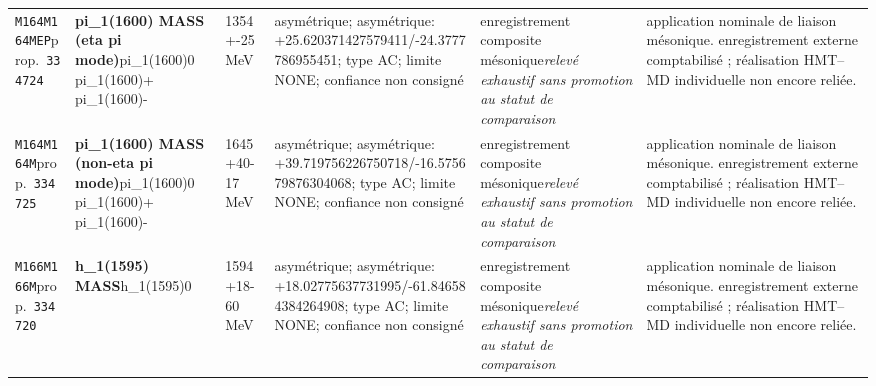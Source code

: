 \begin{landscape}
\begin{longtable}{L{1.85cm}L{4.45cm}L{2.35cm}L{4.05cm}L{3.35cm}L{7.15cm}}
\texttt{M164}\newline \texttt{M164MEP}\newline prop.\ \texttt{334724} & \textbf{pi\_\allowbreak{}1(1600) MASS (eta pi mode)}\newline pi\_\allowbreak{}1(1600)0 \textbar{}\allowbreak{} pi\_\allowbreak{}1(1600)+ \textbar{}\allowbreak{} pi\_\allowbreak{}1(1600)- & 1354+-25\,MeV & asymétrique; asymétrique: +25.620371427579411/-24.3777786955451; type AC; limite NONE; confiance non consigné & enregistrement composite mésonique\newline \emph{relevé exhaustif sans promotion au statut de comparaison} & application nominale de liaison mésonique. enregistrement externe comptabilisé ; réalisation HMT--MD individuelle non encore reliée. \\
\texttt{M164}\newline \texttt{M164M}\newline prop.\ \texttt{334725} & \textbf{pi\_\allowbreak{}1(1600) MASS (non-eta pi mode)}\newline pi\_\allowbreak{}1(1600)0 \textbar{}\allowbreak{} pi\_\allowbreak{}1(1600)+ \textbar{}\allowbreak{} pi\_\allowbreak{}1(1600)- & 1645+40-17\,MeV & asymétrique; asymétrique: +39.719756226750718/-16.575679876304068; type AC; limite NONE; confiance non consigné & enregistrement composite mésonique\newline \emph{relevé exhaustif sans promotion au statut de comparaison} & application nominale de liaison mésonique. enregistrement externe comptabilisé ; réalisation HMT--MD individuelle non encore reliée. \\
\texttt{M166}\newline \texttt{M166M}\newline prop.\ \texttt{334720} & \textbf{h\_\allowbreak{}1(1595) MASS}\newline h\_\allowbreak{}1(1595)0 & 1594+18-60\,MeV & asymétrique; asymétrique: +18.02775637731995/-61.846584384264908; type AC; limite NONE; confiance non consigné & enregistrement composite mésonique\newline \emph{relevé exhaustif sans promotion au statut de comparaison} & application nominale de liaison mésonique. enregistrement externe comptabilisé ; réalisation HMT--MD individuelle non encore reliée. \\

\end{longtable}
\end{landscape}
